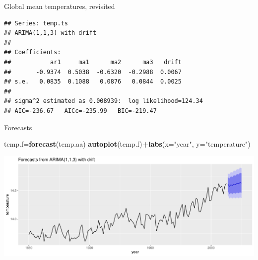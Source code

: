 \documentclass[
  ignorenonframetext,
]{beamer}
\newenvironment{Shaded}{\begin{snugshade}}{\end{snugshade}}
\newcommand{\DataTypeTok}[1]{\textcolor[rgb]{0.13,0.29,0.53}{#1}}
\newcommand{\DecValTok}[1]{\textcolor[rgb]{0.00,0.00,0.81}{#1}}
\newcommand{\KeywordTok}[1]{\textcolor[rgb]{0.13,0.29,0.53}{\textbf{#1}}}
\newcommand{\NormalTok}[1]{#1}
\newcommand{\OperatorTok}[1]{\textcolor[rgb]{0.81,0.36,0.00}{\textbf{#1}}}
\newcommand{\StringTok}[1]{\textcolor[rgb]{0.31,0.60,0.02}{#1}}
\begin{document}
\begin{frame}[fragile]{Global mean temperatures, revisited}
\protect\hypertarget{global-mean-temperatures-revisited}{}

\begin{Shaded}
\end{Shaded}

\begin{verbatim}
## Series: temp.ts 
## ARIMA(1,1,3) with drift 
## 
## Coefficients:
##           ar1     ma1      ma2      ma3   drift
##       -0.9374  0.5038  -0.6320  -0.2988  0.0067
## s.e.   0.0835  0.1088   0.0876   0.0844  0.0025
## 
## sigma^2 estimated as 0.008939:  log likelihood=124.34
## AIC=-236.67   AICc=-235.99   BIC=-219.47
\end{verbatim}

\end{frame}

\begin{frame}[fragile]{Forecasts}
\protect\hypertarget{forecasts-1}{}

\begin{Shaded}
\begin{Highlighting}[]
\NormalTok{temp.f=}\KeywordTok{forecast}\NormalTok{(temp.aa)}
\KeywordTok{autoplot}\NormalTok{(temp.f)}\OperatorTok{+}\KeywordTok{labs}\NormalTok{(}\DataTypeTok{x=}\StringTok{"year"}\NormalTok{, }\DataTypeTok{y=}\StringTok{"temperature"}\NormalTok{)}
\end{Highlighting}
\end{Shaded}

\includegraphics{slides_d29_files/figure-beamer/unnamed-chunk-582-1.pdf}

\end{frame}
\end{document}
